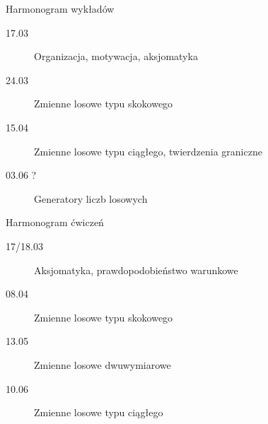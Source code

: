 \documentclass{mp}
\begin{document}
\begin{frame}{Harmonogram wykładów}
\begin{description}
\item[17.03] Organizacja, motywacja, aksjomatyka
\item[24.03] Zmienne losowe typu skokowego
\item[15.04] Zmienne losowe typu ciągłego, twierdzenia graniczne
\item[03.06 \alert{?}] Generatory liczb losowych
\end{description}
\end{frame}
\begin{frame}{Harmonogram ćwiczeń}
\begin{description}
\item[17/18.03] Aksjomatyka, prawdopodobieństwo warunkowe
\item[08.04] Zmienne losowe typu skokowego
\item[13.05] Zmienne losowe dwuwymiarowe
\item[10.06] Zmienne losowe typu ciągłego
\end{description}
\end{frame}
\end{document}
